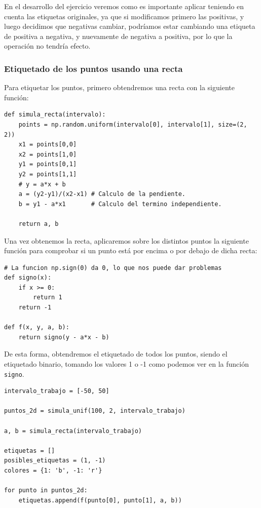 \documentclass[12pt, spanish]{article}
\begin{document}
En el desarrollo del ejercicio veremos como es importante aplicar teniendo en cuenta las etiquetas originales, ya que si modificamos primero las positivas, y luego decidimos que negativas cambiar, podríamos estar cambiando una etiqueta de positiva a negativa, y nuevamente de negativa a positiva, por lo que la operación no tendría efecto.

\subsubsection{Etiquetado de los puntos usando una recta}

Para etiquetar los puntos, primero obtendremos una recta con la siguiente función:

\begin{lstlisting}
def simula_recta(intervalo):
    points = np.random.uniform(intervalo[0], intervalo[1], size=(2, 2))
    x1 = points[0,0]
    x2 = points[1,0]
    y1 = points[0,1]
    y2 = points[1,1]
    # y = a*x + b
    a = (y2-y1)/(x2-x1) # Calculo de la pendiente.
    b = y1 - a*x1       # Calculo del termino independiente.

    return a, b

\end{lstlisting}

Una vez obtenemos la recta, aplicaremos sobre los distintos puntos la siguiente función para comprobar si un punto está por encima o por debajo de dicha recta:

\begin{lstlisting}
# La funcion np.sign(0) da 0, lo que nos puede dar problemas
def signo(x):
	if x >= 0:
		return 1
	return -1

def f(x, y, a, b):
	return signo(y - a*x - b)

\end{lstlisting}

\newpage

De esta forma, obtendremos el etiquetado de todos los puntos, siendo el etiquetado binario, tomando los valores 1 o -1 como podemos ver en la función \texttt{signo}.


\begin{lstlisting}
intervalo_trabajo = [-50, 50]

puntos_2d = simula_unif(100, 2, intervalo_trabajo)

a, b = simula_recta(intervalo_trabajo)

etiquetas = []
posibles_etiquetas = (1, -1)
colores = {1: 'b', -1: 'r'}

for punto in puntos_2d:
	etiquetas.append(f(punto[0], punto[1], a, b))

\end{lstlisting}
\end{document}
